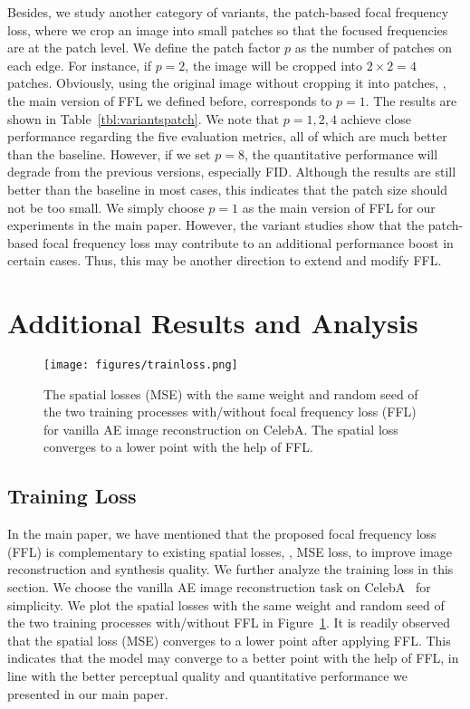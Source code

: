\documentclass[10pt,twocolumn,letterpaper]{article}
\begin{document}
Besides, we study another category of variants, the patch-based focal frequency loss, where we crop an image into small patches so that the focused frequencies are at the patch level.
We define the patch factor $p$ as the number of patches on each edge. For instance, if $p=2$, the image will be cropped into $2 \times 2=4$ patches. Obviously, using the original image without cropping it into patches, \ie, the main version of FFL we defined before, corresponds to $p=1$.
The results are shown in Table~\ref{tbl:variantspatch}.
We note that $p=1,2,4$ achieve close performance regarding the five evaluation metrics, all of which are much better than the baseline.
However, if we set $p=8$, the quantitative performance will degrade from the previous versions, especially FID. Although the results are still better than the baseline in most cases, this indicates that the patch size should not be too small.
We simply choose $p=1$ as the main version of FFL for our experiments in the main paper.
However, the variant studies show that the patch-based focal frequency loss may contribute to an additional performance boost in certain cases.
Thus, this may be another direction to extend and modify FFL.



\section{Additional Results and Analysis}
\label{sec:analysis}


\begin{figure}[t]
	\centering
\texttt{[image: figures/trainloss.png]}
\caption{The spatial losses (MSE) with the same weight and random seed of the two training processes with/without focal frequency loss (FFL) for vanilla AE image reconstruction on CelebA. The spatial loss converges to a lower point with the help of FFL.}
	\label{fig:trainloss}
	\vspace{-0.2cm}
\end{figure}


\subsection{Training Loss}
\label{sec:trainingloss}
In the main paper, we have mentioned that the proposed focal frequency loss (FFL) is complementary to existing spatial losses, \eg, MSE loss, to improve image reconstruction and synthesis quality.
We further analyze the training loss in this section. We choose the vanilla AE image reconstruction task on CelebA~\cite{celeba} for simplicity.
We plot the spatial losses with the same weight and random seed of the two training processes with/without FFL in Figure~\ref{fig:trainloss}.
It is readily observed that the spatial loss (MSE) converges to a lower point after applying FFL.
This indicates that the model may converge to a better point with the help of FFL, in line with the better perceptual quality and quantitative performance we presented in our main paper. 
\end{document}
